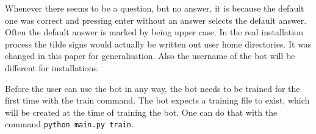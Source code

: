 Whenever there seems to be a question, but no answer, it is because the default
one was correct and pressing enter without an answer selects the default answer.
Often the default answer is marked by being upper case. In the real
installation process the tilde signs would actually be written out user home
directories. It was changed in this paper for generalisation. Also the username
of the bot will be different for installations.

Before the user can use the bot in any way, the bot needs to be trained for the first time with the train command. The bot expects a training file to exist, which will be created at the time of training the bot. One can do that with the command \verb;python main.py train;.
